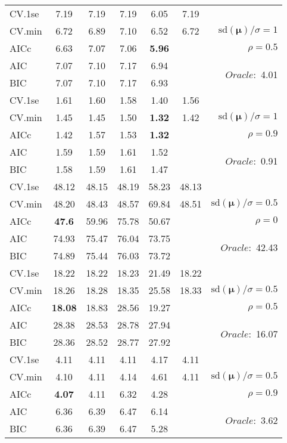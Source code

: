 \begin{table}
\begin{center}
\begin{tabular}{l*{5}{c}|r}
 \hline 
CV.1se & 7.19 & 7.19 & 7.19 & 6.05 & 7.19 & \\
CV.min & 6.72 & 6.89 & 7.10 & 6.52 & 6.72 &  $\mathrm{sd}(\mathbf{\mu})/\sigma=1$ \\
AICc & 6.63 & 7.07 & 7.06 & {\bf 5.96} & & $\rho=0.5$ \\
AIC & 7.07 & 7.10 & 7.17 & 6.94 & &  \multirow{2}{*}{$Oracle: $ 4.01} \\
BIC & 7.07 & 7.10 & 7.17 & 6.93 & &  \\
 \hline 
CV.1se & 1.61 & 1.60 & 1.58 & 1.40 & 1.56 & \\
CV.min & 1.45 & 1.45 & 1.50 & {\bf 1.32} & 1.42 &  $\mathrm{sd}(\mathbf{\mu})/\sigma=1$ \\
AICc & 1.42 & 1.57 & 1.53 & {\bf 1.32} & & $\rho=0.9$ \\
AIC & 1.59 & 1.59 & 1.61 & 1.52 & &  \multirow{2}{*}{$Oracle: $ 0.91} \\
BIC & 1.58 & 1.59 & 1.61 & 1.47 & &  \\
 \hline 
CV.1se & 48.12 & 48.15 & 48.19 & 58.23 & 48.13 & \\
CV.min & 48.20 & 48.43 & 48.57 & 69.84 & 48.51 &  $\mathrm{sd}(\mathbf{\mu})/\sigma=0.5$ \\
AICc & {\bf 47.6} & 59.96 & 75.78 & 50.67 & & $\rho=0$ \\
AIC & 74.93 & 75.47 & 76.04 & 73.75 & &  \multirow{2}{*}{$Oracle: $ 42.43} \\
BIC & 74.89 & 75.44 & 76.03 & 73.72 & &  \\
 \hline 
CV.1se & 18.22 & 18.22 & 18.23 & 21.49 & 18.22 & \\
CV.min & 18.26 & 18.28 & 18.35 & 25.58 & 18.33 &  $\mathrm{sd}(\mathbf{\mu})/\sigma=0.5$ \\
AICc & {\bf 18.08} & 18.83 & 28.56 & 19.27 & & $\rho=0.5$ \\
AIC & 28.38 & 28.53 & 28.78 & 27.94 & &  \multirow{2}{*}{$Oracle: $ 16.07} \\
BIC & 28.36 & 28.52 & 28.77 & 27.92 & &  \\
 \hline 
CV.1se & 4.11 & 4.11 & 4.11 & 4.17 & 4.11 & \\
CV.min & 4.10 & 4.11 & 4.14 & 4.61 & 4.11 &  $\mathrm{sd}(\mathbf{\mu})/\sigma=0.5$ \\
AICc & {\bf 4.07} & 4.11 & 6.32 & 4.28 & & $\rho=0.9$ \\
AIC & 6.36 & 6.39 & 6.47 & 6.14 & &  \multirow{2}{*}{$Oracle: $ 3.62} \\
BIC & 6.36 & 6.39 & 6.47 & 5.28 & &  \\
 \hline 
\end{tabular}
\end{center}
\vspace{-1cm}
\end{table}




